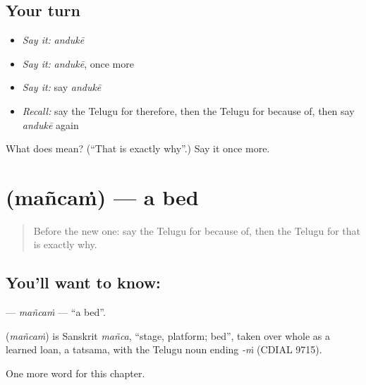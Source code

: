 \subsection*{Your turn}
\begin{itemize}
\raggedright
  \item \emph{Say it:} \emph{andukē}
  \item \emph{Say it:} \emph{andukē}, once more
  \item \emph{Say it:} say \emph{andukē}
  \item \emph{Recall:} say the Telugu for therefore, then the Telugu for because of, then say \emph{andukē} again
\end{itemize}

\begin{tcolorbox}[breakable,colback=teal!4,colframe=teal!35!black,title={Before you move on}]
What does  mean? (\textquotedblleft{}That is exactly why\textquotedblright{}.) Say it once more.
\end{tcolorbox}
\section[\texorpdfstring{\te{మంచం} (mañcaṁ)}{మంచం (mañcaṁ)}]{ (mañcaṁ) — a bed}

\label{lesson:TE-C109-mancam}



\begin{quote}
Before the new one: say the Telugu for because of, then the Telugu for that is exactly why.
\end{quote}

\subsection*{You'll want to know: }
\textbf{} — \emph{mañcaṁ} — \textquotedblleft{}a bed\textquotedblright{}.

\begin{cousinweb}
\textbf{} (\emph{mañcaṁ}) is Sanskrit \emph{mañca}, \textquotedblleft{}stage, platform; bed\textquotedblright{}, taken over whole as a learned loan, a tatsama, with the Telugu noun ending \emph{-ṁ} (CDIAL 9715).
\end{cousinweb}

\begin{grammarlens}[title={What you've built}]
One more word for this chapter.
\end{grammarlens}

